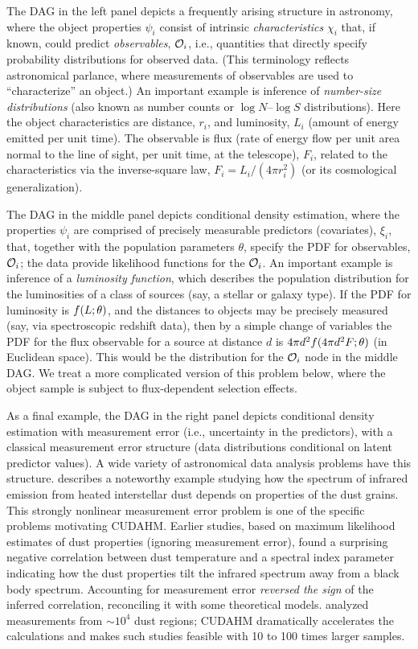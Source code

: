 The DAG in the left panel depicts a frequently arising structure in astronomy, where the object properties $\psi_i$ consist of intrinsic \emph{characteristics} $\chi_i$ that, if known, could predict \emph{observables}, $\mathcal{O}_i$, i.e., quantities that directly specify probability distributions for observed data.
(This terminology reflects astronomical parlance, where measurements of observables are used to ``characterize'' an object.)
An important example is inference of \emph{number-size distributions} (also known as number counts or $\log N$--$\log S$ distributions).
Here the object characteristics are distance, $r_i$, and luminosity, $L_i$ (amount of energy emitted per unit time).
The observable is flux (rate of energy flow per unit area normal to the line of sight, per unit time, at the telescope), $F_i$, related to the characteristics via the inverse-square law, $F_i = L_i/(4\pi r_i^2)$ (or its cosmological generalization).

The DAG in the middle panel depicts conditional density estimation, where the properties $\psi_i$ are comprised of precisely measurable predictors (covariates), $\xi_i$, that, together with the population parameters $\theta$, specify the PDF for observables, $\mathcal{O}_i$; the data provide likelihood functions for the $\mathcal{O}_i$.
An important example is inference of a \emph{luminosity function}, which describes the population distribution for the luminosities of a class of sources (say, a stellar or galaxy type).
If the PDF for luminosity is $f(L;\theta)$, and the distances to objects may be precisely measured (say, via spectroscopic redshift data), then by a simple change of variables the PDF for the flux observable for a source at distance $d$ is $4\pi d^2 f(4\pi d^2 F; \theta)$ (in Euclidean space).
This would be the distribution for the $\mathcal{O}_i$ node in the middle DAG.
We treat a more complicated version of this problem below, where the object sample is subject to flux-dependent selection effects.

As a final example, the DAG in the right panel depicts conditional density estimation with measurement error (i.e., uncertainty in the predictors), with a classical measurement error structure (data distributions conditional on latent predictor values).
A wide variety of astronomical data analysis problems have this structure.
\cite{K+12-DustSEDs} describes a noteworthy example studying how the spectrum of infrared emission from heated interstellar dust depends on properties of the dust grains.
This strongly nonlinear measurement error problem is one of the specific problems motivating CUDAHM.
Earlier studies, based on maximum likelihood estimates of dust properties (ignoring measurement error), found a surprising negative correlation between dust temperature and a spectral index parameter indicating how the dust properties tilt the infrared spectrum away from a black body spectrum.
Accounting for measurement error \emph{reversed the sign} of the inferred correlation, reconciling it with some theoretical models.
\cite{K+12-DustSEDs} analyzed measurements from $\sim\!10^4$ dust regions; CUDAHM dramatically accelerates the calculations and makes such studies feasible with 10 to 100 times larger samples.

